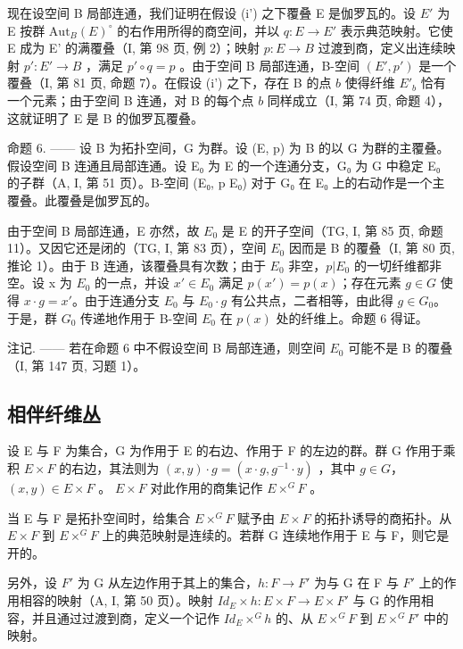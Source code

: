 现在设空间 B 局部连通，我们证明在假设 (i') 之下覆叠 E 是伽罗瓦的。设 \(E'\) 为 E 按群 \(\mathrm{Aut}_{B}(E)^{\circ}\) 的右作用所得的商空间，并以 \(q\colon E \to E'\) 表示典范映射。它使 E 成为 E' 的满覆叠（I, 第 98 页, 例 2）；映射 \(p\colon E \to B\) 过渡到商，定义出连续映射 \(p'\colon E' \to B\) ，满足 \(p'\circ q = p\) 。由于空间 B 局部连通，B-空间 \((E', p')\) 是一个覆叠（I, 第 81 页, 命题 7）。在假设 (i') 之下，存在 B 的点 \(b\) 使得纤维 \(E'_{b}\) 恰有一个元素；由于空间 B 连通，对 B 的每个点 \(b\) 同样成立（I, 第 74 页, 命题 4），这就证明了 E 是 B 的伽罗瓦覆叠。

命题 6. —— 设 B 为拓扑空间，G 为群。设 (E, p) 为 B 的以 G 为群的主覆叠。假设空间 B 连通且局部连通。设 E₀ 为 E 的一个连通分支，G₀ 为 G 中稳定 E₀ 的子群（A, I, 第 51 页）。B-空间 (E₀, p \textbar{} E₀) 对于 G₀ 在 E₀ 上的右动作是一个主覆叠。此覆叠是伽罗瓦的。

由于空间 B 局部连通，E 亦然，故 \(E_{0}\) 是 E 的开子空间（TG, I, 第 85 页, 命题 11）。又因它还是闭的（TG, I, 第 83 页），空间 \(E_{0}\) 因而是 B 的覆叠（I, 第 80 页, 推论 1）。由于 B 连通，该覆叠具有次数；由于 \(E_{0}\) 非空，\(p|E_{0}\) 的一切纤维都非空。设 x 为 \(E_{0}\) 的一点，并设 \(x' \in E_{0}\) 满足 \(p(x') = p(x)\)；存在元素 \(g \in G\) 使得 \(x \cdot g = x'\)。由于连通分支 \(E_{0}\) 与 \(E_{0} \cdot g\) 有公共点，二者相等，由此得 \(g \in G_{0}\)。于是，群 \(G_{0}\) 传递地作用于 B-空间 \(E_{0}\) 在 \(p(x)\) 处的纤维上。命题 6 得证。

注记. —— 若在命题 6 中不假设空间 B 局部连通，则空间 \(E_{0}\) 可能不是 B 的覆叠（I, 第 147 页, 习题 1）。

\subsection{相伴纤维丛}

设 E 与 F 为集合，G 为作用于 E 的右边、作用于 F 的左边的群。群 G 作用于乘积 \(E \times F\) 的右边，其法则为 \((x, y) \cdot g = (x \cdot g, g^{-1} \cdot y)\) ，其中 \(g \in G\)，\((x, y) \in E \times F\) 。 \(E \times F\) 对此作用的商集记作 \(E \times^{G} F\) 。

当 E 与 F 是拓扑空间时，给集合 \(E \times^{G} F\) 赋予由 \(E \times F\) 的拓扑诱导的商拓扑。从 \(E \times F\) 到 \(E \times^{G} F\) 上的典范映射是连续的。若群 G 连续地作用于 E 与 F，则它是开的。

另外，设 \(F'\) 为 G 从左边作用于其上的集合，\(h: F \to F'\) 为与 G 在 F 与 \(F'\) 上的作用相容的映射（A, I, 第 50 页）。映射 \(Id_{E} \times h: E \times F \to E \times F'\) 与 G 的作用相容，并且通过过渡到商，定义一个记作 \(Id_{E} \times^{G} h\) 的、从 \(E \times^{G} F\) 到 \(E \times^{G} F'\) 中的映射。


